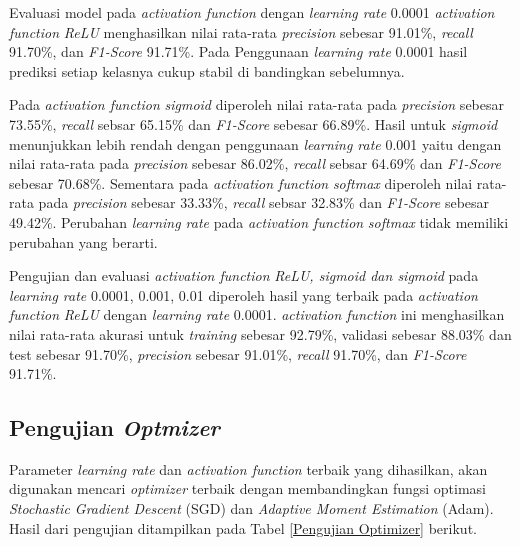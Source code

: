       Evaluasi model pada \textit{activation function} dengan \textit{learning rate} 0.0001 \textit{activation function} \textit{ReLU} menghasilkan nilai rata-rata \textit{precision} sebesar 91.01\%, \textit{recall} 91.70\%, dan\textit{ F1-Score} 91.71\%. Pada 
      Penggunaan \textit{learning rate} 0.0001 hasil prediksi setiap kelasnya cukup stabil di bandingkan sebelumnya. 
      
      Pada \textit{activation function} \textit{sigmoid} diperoleh nilai rata-rata pada \textit{precision} sebesar 73.55\%, \textit{recall} sebsar 65.15\% dan\textit{ F1-Score} sebesar 66.89\%. Hasil untuk \textit{sigmoid} menunjukkan lebih rendah dengan penggunaan \textit{learning rate} 0.001 yaitu dengan nilai rata-rata pada \textit{precision} sebesar 86.02\%, \textit{recall} sebsar 64.69\% dan\textit{ F1-Score} sebesar 70.68\%. Sementara pada \textit{activation function} \textit{softmax} diperoleh nilai rata-rata pada \textit{precision} sebesar 33.33\%, \textit{recall} sebsar 32.83\% dan\textit{ F1-Score} sebesar 49.42\%.
     Perubahan \textit{learning rate} pada \textit{activation function} \textit{softmax} tidak memiliki perubahan yang berarti. 
     
     
     
    Pengujian dan evaluasi \textit{activation function} \textit{ReLU, sigmoid dan sigmoid} pada \textit{learning rate} 0.0001, 0.001, 0.01 diperoleh hasil yang terbaik pada \textit{activation function} \textit{ReLU} dengan \textit{learning rate} 0.0001. \textit{activation function} ini menghasilkan nilai rata-rata  akurasi untuk \textit{training} sebesar 92.79\%, validasi sebesar 88.03\% dan test sebesar 91.70\%, \textit{precision} sebesar 91.01\%, \textit{recall} 91.70\%, dan\textit{ F1-Score} 91.71\%.

\subsection{Pengujian \textit{Optmizer}}

    Parameter \textit{learning rate} dan \textit{activation function} terbaik yang dihasilkan, akan digunakan mencari \textit{optimizer} terbaik dengan membandingkan fungsi optimasi \textit{Stochastic Gradient Descent} (SGD) dan \textit{Adaptive Moment Estimation} (Adam). Hasil dari pengujian ditampilkan pada Tabel \ref{Pengujian Optimizer} berikut.


